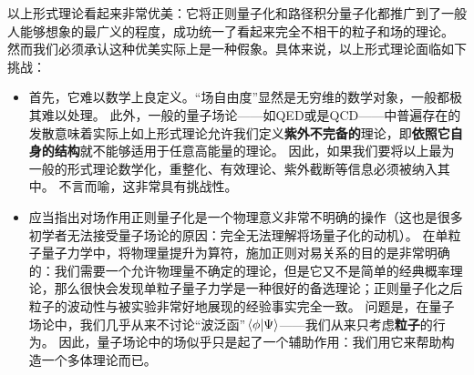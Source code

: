 \documentclass[hyperref, UTF8, a4paper]{ctexbook}
\renewcommand{\emph}{\textbf}
\begin{document}
以上形式理论看起来非常优美：它将正则量子化和路径积分量子化都推广到了一般人能够想象的最广义的程度，成功统一了看起来完全不相干的粒子和场的理论。
然而我们必须承认这种优美实际上是一种假象。具体来说，以上形式理论面临如下挑战：
\begin{itemize}
    \item 首先，它难以数学上良定义。“场自由度”显然是无穷维的数学对象，一般都极其难以处理。
    此外，一般的量子场论——如QED或是QCD——中普遍存在的发散意味着实际上如上形式理论允许我们定义\emph{紫外不完备的}理论，即\emph{依照它自身的结构}就不能够适用于任意高能量的理论。
    因此，如果我们要将以上最为一般的形式理论数学化，重整化、有效理论、紫外截断等信息必须被纳入其中。
    不言而喻，这非常具有挑战性。
    \item 应当指出对场作用正则量子化是一个物理意义非常不明确的操作（这也是很多初学者无法接受量子场论的原因：完全无法理解将场量子化的动机）。
    在单粒子量子力学中，将物理量提升为算符，施加正则对易关系的目的是非常明确的：我们需要一个允许物理量不确定的理论，但是它又不是简单的经典概率理论，那么很快会发现单粒子量子力学是一种很好的备选理论；正则量子化之后粒子的波动性与被实验非常好地展现的经验事实完全一致。
    问题是，在量子场论中，我们几乎从来不讨论“波泛函”$\braket*{\phi}{\Psi}$——我们从来只考虑\emph{粒子}的行为。
    因此，量子场论中的场似乎只是起了一个辅助作用：我们用它来帮助构造一个多体理论而已。
    

\end{itemize}
\end{document}
